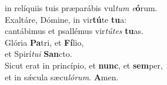 \evenverse in relíquiis tuis præparábis vul\textit{tum} \textit{e}\textbf{ó}rum.\\
\oddverse Exaltáre, Dómine, in vir\textbf{tú}te \textbf{tu}a:~\*\\
\oddverse cantábimus et psallémus vir\textit{tú}\textit{tes} \textbf{tu}as.\\
\evenverse Glória \textbf{Pa}tri, et \textbf{Fí}lio,~\*\\
\evenverse et Spirí\textit{tu}\textit{i} \textbf{San}cto.\\
\oddverse Sicut erat in princípio, et \textbf{nunc}, et \textbf{sem}per,~\*\\
\oddverse et in sǽcula sæcu\textit{ló}\textit{rum}. \textbf{A}men.\\

